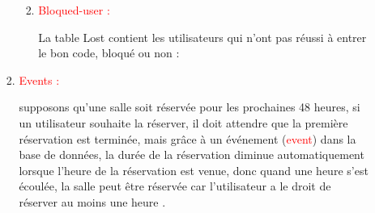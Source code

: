 \documentclass{article}
\begin{document}
\begin{enumerate}
\begin{enumerate}
\begin{enumerate}
\begin{enumerate}
	  \vspace{3cm}
	  	
	  \item \textcolor{red}{Bloqued-user :}
	 
	 La table Lost contient les utilisateurs qui n'ont pas réussi à entrer le bon code, bloqué ou non :
	 \vspace{1cm}
	 
	 \hspace*{-1.05in}
               \noindent{}	
	 
	 
	 
	 
	 
	 
	 
	  \end{enumerate}
	 
	 
	 
	 \vspace{3cm}
	 
	 
	 \item \textcolor{red}{\large Events :}	 
	 
	 
	 
           
           
            \setlength{\parindent}{1cm} supposons qu'une salle soit réservée pour les prochaines 48 heures, si un utilisateur souhaite la réserver, il doit attendre que la première réservation est terminée, mais grâce à un événement (\textcolor{red}{event}) dans la base de données, la durée de la réservation diminue automatiquement lorsque l'heure de la réservation est venue, donc quand une heure s'est écoulée, la salle peut être réservée car l'utilisateur a le droit de réserver au moins une heure .
            \vspace{1.25cm}
            

\end{enumerate}
\end{enumerate}
\end{enumerate}
\end{document}
